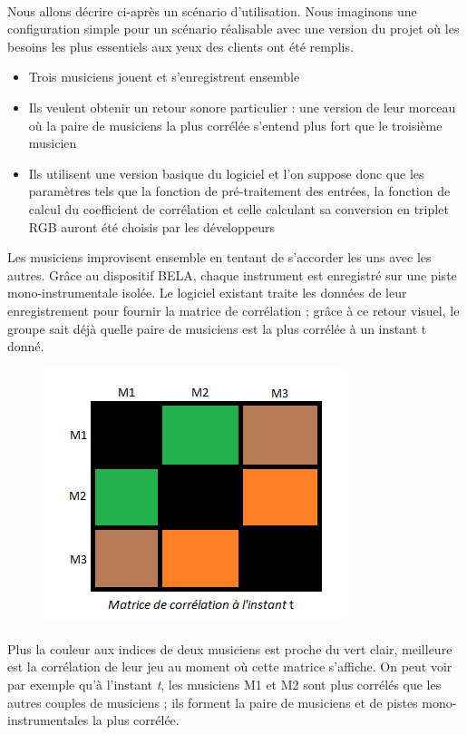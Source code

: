 \documentclass{article}
\begin{document}
\paragraph{}
Nous allons décrire ci-après un scénario d'utilisation. Nous imaginons une
configuration simple pour un scénario réalisable avec une version du projet où
les besoins les plus essentiels aux yeux des clients ont été remplis.
\begin{itemize}
 \item Trois musiciens jouent et s'enregistrent ensemble
 \item Ils veulent obtenir un retour sonore particulier : une version de leur
       morceau où la paire de musiciens la plus corrélée s'entend plus fort que le
       troisième musicien
 \item Ils utilisent une version basique du logiciel et l'on suppose donc que
       les paramètres tels que la fonction de pré-traitement des entrées, la fonction
       de calcul du coefficient de corrélation et celle calculant sa conversion en
       triplet RGB auront été choisis par les développeurs
\end{itemize}
Les musiciens improvisent ensemble en tentant de s'accorder les uns avec les
autres. Grâce au dispositif BELA, chaque instrument est enregistré sur une
piste mono-instrumentale isolée. Le logiciel existant traite les données de
leur enregistrement pour fournir la matrice de corrélation ; grâce à ce retour
visuel, le groupe sait déjà quelle paire de musiciens est la plus corrélée à
un instant t donné.
\newpage
\begin{figure}[h]
 \centering
 \includegraphics[scale=0.50]{matrice_correlation.png}
\end{figure}
\paragraph{}
Plus la couleur aux indices de deux musiciens est proche du vert clair,
meilleure est la corrélation de leur jeu au moment où cette matrice s'affiche.
On peut voir par exemple qu'à l'instant \textit{t}, les musiciens M1 et M2
sont plus corrélés que les autres couples de musiciens ; ils forment la paire
de musiciens et de pistes mono-instrumentales la plus corrélée.
\end{document}
